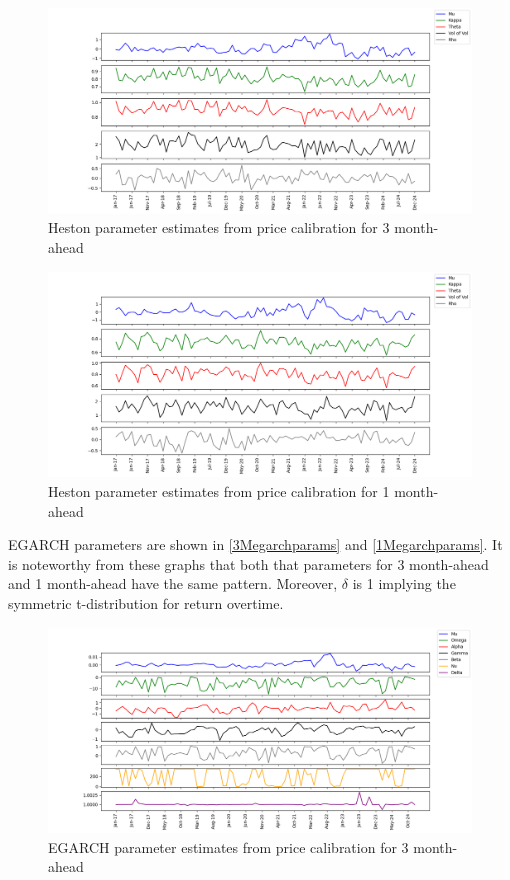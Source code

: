 \documentclass[12pt,a4paper]{article}
\newcommand\colorAutoref[1]{{\hypersetup{linkcolor=black}\autoref{#1}}}
\numberwithin{equation}{section}
\begin{document}
\begin{figure}[h!] 
\includegraphics[scale=1,width=1\linewidth,height=0.4\textheight]{heston_params_3m.png}
\caption{Heston parameter estimates from price calibration for 3 month-ahead}
\label{3Mhestonparams}
\end{figure}

\begin{figure}[h!] 
\includegraphics[scale=1,width=1\linewidth,height=0.4\textheight]{heston_params_1m.png}
\caption{Heston parameter estimates from price calibration for 1 month-ahead}
\label{1Mhestonparams}
\end{figure}

EGARCH parameters are shown in \colorAutoref{3Megarchparams} and  \colorAutoref{1Megarchparams}. It is noteworthy from these graphs that both that parameters for 3 month-ahead and 1 month-ahead have the same pattern. Moreover, $\delta$ is 1 implying the symmetric t-distribution for return overtime. 

\begin{figure}[h!] 
\includegraphics[scale=1,width=1\linewidth,height=0.4\textheight]{egarch_params_3m.png}
\caption{EGARCH parameter estimates from price calibration for 3 month-ahead}
\label{3Megarchparams}
\end{figure}
\end{document}
